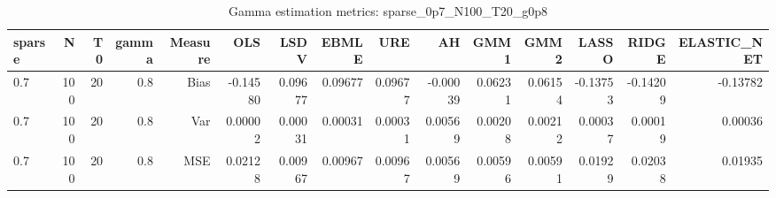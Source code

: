 \begin{table}[!htbp]\centering
\caption{Gamma estimation metrics: sparse_0p7_N100_T20_g0p8}
\label{tab:table1_sparse_0p7_N100_T20_g0p8}
\begin{tabular}{lrrrrrrrrrrrrrr}
\hline
sparse & N & T0 & gamma & Measure & OLS & LSDV & EBMLE & URE & AH & GMM1 & GMM2 & LASSO & RIDGE & ELASTIC_NET \\
\hline
0.7 & 100 & 20 & 0.8 & Bias & -0.14580 & 0.09677 & 0.09677 & 0.09677 & -0.00039 & 0.06231 & 0.06154 & -0.13753 & -0.14209 & -0.13782 \\
0.7 & 100 & 20 & 0.8 & Var & 0.00002 & 0.00031 & 0.00031 & 0.00031 & 0.00569 & 0.00208 & 0.00212 & 0.00037 & 0.00019 & 0.00036 \\
0.7 & 100 & 20 & 0.8 & MSE & 0.02128 & 0.00967 & 0.00967 & 0.00967 & 0.00569 & 0.00596 & 0.00591 & 0.01929 & 0.02038 & 0.01935 \\
\hline
\end{tabular}
\end{table}

